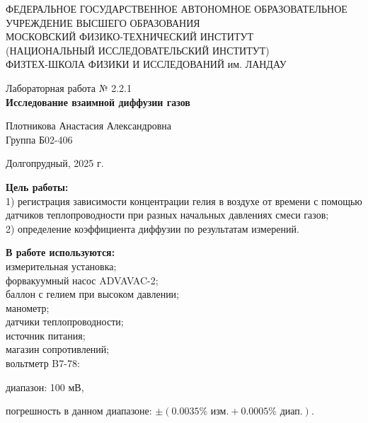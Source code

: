 \documentclass[a4paper,12pt]{article} %
\begin{document}
\begin{center}
	\footnotesize{ФЕДЕРАЛЬНОЕ ГОСУДАРСТВЕННОЕ АВТОНОМНОЕ ОБРАЗОВАТЕЛЬНОЕ 			УЧРЕЖДЕНИЕ ВЫСШЕГО ОБРАЗОВАНИЯ}\\
	\footnotesize{МОСКОВСКИЙ ФИЗИКО-ТЕХНИЧЕСКИЙ ИНСТИТУТ\\(НАЦИОНАЛЬНЫЙ 			ИССЛЕДОВАТЕЛЬСКИЙ ИНСТИТУТ)}\\
	\footnotesize{ФИЗТЕХ-ШКОЛА ФИЗИКИ И ИССЛЕДОВАНИЙ им. ЛАНДАУ\\}
	\hfill \break
	\hfill \break
	\hfill \break
	\hfill \break
\end{center}

\begin{center}   
    \hfill \break
	\hfill \break
	\hfill \break
	\hfill \break    \hfill \break
	\hfill \break
	\hfill \break
	\hfill \break
    \hfill \break
    \hfill \break
	\hfill \break
	\large{Лабораторная работа № 2.2.1\\\textbf{Исследование взаимной диффузии газов}}\\
	\begin{flushright}
		Плотникова Анастасия Александровна\\
		Группа Б02-406
	\end{flushright}
	\hfill \break
	\hfill \break
	\hfill \break
\end{center}
\hfill \break
\hfill \break
\hfill \break
\hfill \break
\hfill \break
\hfill \break
\hfill \break
\hfill \break
\hfill \break
\hfill \break
\hfill \break
\hfill \break
\hfill \break
\begin{center}
	Долгопрудный, 2025 г.
\end{center}
\thispagestyle{empty}
\newpage
	\textbf{Цель работы:}\\ 
  1) регистрация зависимости концентрации гелия в воздухе от времени с помощью датчиков теплопроводности при разных начальных давлениях смеси газов;\\ 
  2) определение коэффициента диффузии по результатам измерений.
	\hfill \break
	
	\textbf{В работе используются:}\\ 
  измерительная установка;\\ 
  форвакуумный насос ADVAVAC-2;\\ 
  баллон с гелием при высоком давлении;\\ 
  манометр;\\ 
  датчики теплопроводности; \\
  источник питания;\\ 
  магазин сопротивлений;\\ 
  вольтметр B7-78: 
  \par диапазон: 100 мВ, 
  \par погрешность в данном диапазоне: $\pm (0.0035 \% \text{ изм.} + 0.0005 \% \text{ диап.})$.
	\hfill \break
\end{document}
